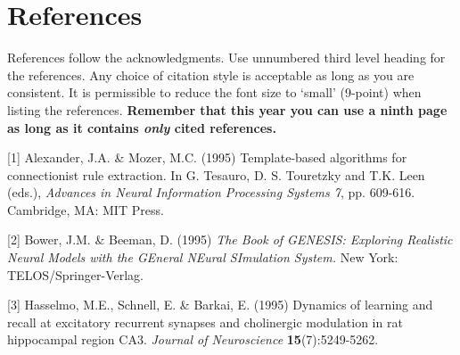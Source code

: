 \documentclass{article} %
\begin{document}
\section*{References}

References follow the acknowledgments. Use unnumbered third level heading for
the references. Any choice of citation style is acceptable as long as you are
consistent. It is permissible to reduce the font size to `small' (9-point) 
when listing the references. {\bf Remember that this year you can use
a ninth page as long as it contains \emph{only} cited references.}

\small{
[1] Alexander, J.A. \& Mozer, M.C. (1995) Template-based algorithms
for connectionist rule extraction. In G. Tesauro, D. S. Touretzky
and T.K. Leen (eds.), {\it Advances in Neural Information Processing
Systems 7}, pp. 609-616. Cambridge, MA: MIT Press.

[2] Bower, J.M. \& Beeman, D. (1995) {\it The Book of GENESIS: Exploring
Realistic Neural Models with the GEneral NEural SImulation System.}
New York: TELOS/Springer-Verlag.

[3] Hasselmo, M.E., Schnell, E. \& Barkai, E. (1995) Dynamics of learning
and recall at excitatory recurrent synapses and cholinergic modulation
in rat hippocampal region CA3. {\it Journal of Neuroscience}
{\bf 15}(7):5249-5262.
}
\end{document}
